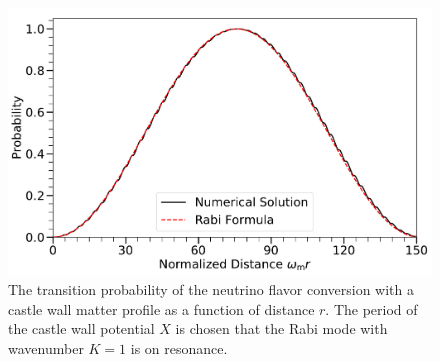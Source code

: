 

\begin{figure}[!htbp]
        \includegraphics[width=\columnwidth]{chapters/assets/matter/castle-wall-with-legend}%
    \caption{The transition probability of the neutrino flavor conversion with a castle wall matter profile as a function of distance $r$. The period of the castle wall potential $X$ is chosen that the Rabi mode with wavenumber $K=1$ is on resonance.
      }
    \label{fig-akhmedovOscPlt}
\end{figure}

